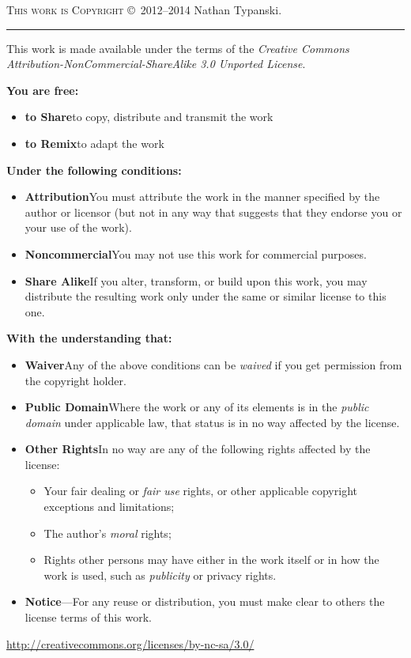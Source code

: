 \begin{center}
\textsc{This work is Copyright} \copyright\ 2012--2014 Nathan Typanski.
\\\noindent\rule{\textwidth}{0.4pt}
\end{center}

This work is made available under the terms of the \emph{Creative Commons
    Attribution-NonCommercial-ShareAlike 3.0 Unported License}.

\textbf{You are free:}
\begin{itemize}
  \item[] \textbf{to Share}\dash{}to copy, distribute and transmit the work
  \item[] \textbf{to Remix}\dash{}to adapt the work
\end{itemize}

\textbf{Under the following conditions:}
\begin{itemize}
  \item[]\ccby\textbf{Attribution}\dash{}You must attribute the work in the manner
      specified by the author or licensor (but not in any way that suggests that
      they endorse you or your use of the work).
  \item[] \ccnc\textbf{Noncommercial}\dash{}You may not use this work for
      commercial purposes.
  \item[] \ccsa\textbf{Share Alike}\dash{}If you alter, transform, or build upon
      this work, you may distribute the resulting work only under the same or
      similar license to this one.
\end{itemize}

\textbf{With the understanding that:}
\begin{itemize}
  \item[]\textbf{Waiver}\dash{}Any of the above conditions can be \emph{waived} if
      you get permission from the copyright holder.
  \item[]\textbf{Public Domain}\dash{}Where the work or any of its elements is in
      the \emph{public domain} under applicable law, that status is in no way
      affected by the license.
  \item[]\textbf{Other Rights}\dash{}In no way are any of the following rights
      affected by the license:
  \begin{itemize}
    \item Your fair dealing or \emph{fair use} rights, or other applicable
        copyright exceptions and limitations;
    \item The author's \emph{moral} rights;
    \item Rights other persons may have either in the work itself or in how the
        work is used, such as \emph{publicity} or privacy rights.
  \end{itemize}
  \item[]\textbf{Notice}---For any reuse or distribution, you must make clear
      to others the license terms of this work.
\end{itemize}
\begin{center}
  \url{http://creativecommons.org/licenses/by-nc-sa/3.0/}

  \cc{}
\end{center}

